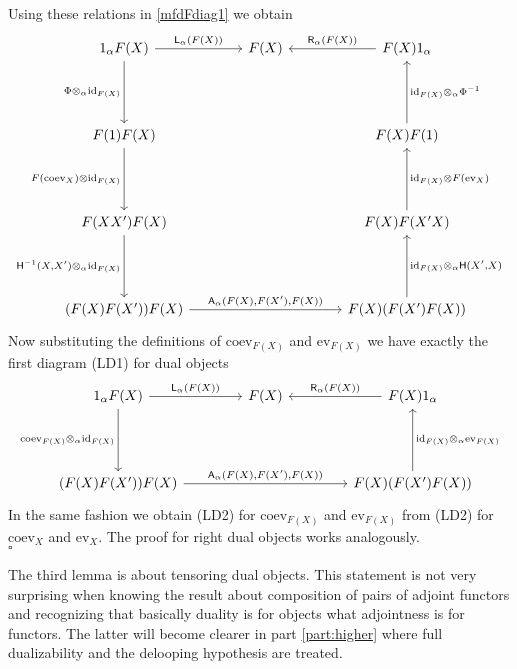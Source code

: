 \begin{prf}
Using these relations in \eqref{mfdFdiag1} we obtain
\begin{equation*}
\begin{tikzcd}[row sep=4.5em,column sep=3.8em]
  1_{\alpha} F(X)
  \ar{r}{\mathsf{L}_{\alpha}(F(X))}
  \ar{d}[swap]{\Phi \otimes_{\alpha} \mathrm{id}_{F(X)}}
  &
  F(X)
  &
  F(X) 1_{\alpha}
  \ar{l}[swap]{\mathsf{R}_{\alpha}(F(X))}
  \\
  F(1) F(X)
  \ar{d}[swap]{F(\mathrm{coev}_{X}) \otimes \mathrm{id}_{F(X)}}
  &
  &
  F(X) F(1)
  \ar{u}[swap]{\mathrm{id}_{F(X)} \otimes_{\alpha} \Phi^{-1}}
  \\
  F(X X^{\prime}) F(X)
  \ar{d}[swap]{\mathsf{H}^{-1}(X,X^{\prime}) \otimes_{\alpha} \mathrm{id}_{F(X)}}
  &
  &
  F(X) F(X^{\prime} X)
  \ar{u}[swap]{\mathrm{id}_{F(X)} \otimes F(\mathrm{ev}_{X})}
  \\
  (F(X) F(X^{\prime})) F(X)
  \ar{rr}{\mathsf{A}_{\alpha}(F(X),F(X^{\prime}),F(X))}
  &
  &
  F(X) (F(X^{\prime}) F(X))
  \ar{u}[swap]{\mathrm{id}_{F(X)} \otimes_{\alpha} \mathsf{H}(X^{\prime},X)}
\end{tikzcd}
\end{equation*}
Now substituting the definitions of $\mathrm{coev}_{F(X)}$ and $\mathrm{ev}_{F(X)}$ we have exactly the first diagram (LD1) for dual objects
\begin{equation*}
\begin{tikzcd}[row sep=4.5em,column sep=4.2em]
  1_{\alpha} F(X)
  \ar{r}{\mathsf{L}_{\alpha}(F(X))}
  \ar{d}[swap]{\mathrm{coev}_{F(X)} \otimes_{\alpha} \mathrm{id}_{F(X)}}
  &
  F(X)
  &
  F(X) 1_{\alpha}
  \ar{l}[swap]{\mathsf{R}_{\alpha}(F(X))}
  \\
  (F(X) F(X^{\prime})) F(X)
  \ar{rr}{\mathsf{A}_{\alpha}(F(X),F(X^{\prime}),F(X))}
  &
  &
  F(X) (F(X^{\prime}) F(X))
  \ar{u}[swap]{\mathrm{id}_{F(X)} \otimes_{\alpha} \mathrm{ev}_{F(X)}}
\end{tikzcd}
\end{equation*}
In the same fashion we obtain (LD2) for $\mathrm{coev}_{F(X)}$ and $\mathrm{ev}_{F(X)}$ from (LD2) for $\mathrm{coev}_{X}$ and $\mathrm{ev}_{X}$. The proof for right dual objects works analogously.
\\
\phantom{proven}
\hfill
$\square$
\end{prf}
The third lemma is about tensoring dual objects. This statement is not very surprising when knowing the result about composition of pairs of adjoint functors and recognizing that basically duality is for objects what adjointness is for functors. The latter will become clearer in part \ref{part:higher} where full dualizability and the delooping hypothesis are treated.
